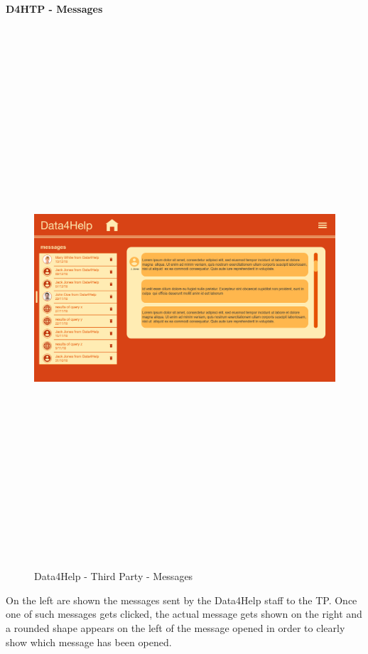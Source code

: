 \paragraph{D4HTP - Messages}
\begin{figure}[H]
    \includegraphics[width=.6\linewidth, height = 20cm, keepaspectratio]{./Images/Mockups/Data4Help/D4HTP/D4HTP_ShowMessages.png}
    \centering
    \caption{Data4Help - Third Party - Messages}
    \label{fig:sab}
  \end{figure}
On the left are shown the messages sent by the Data4Help staff to the TP. 
Once one of such messages gets clicked, the actual message gets shown on the right and a rounded shape appears on the left of the message opened in order to clearly show which message has been opened.

